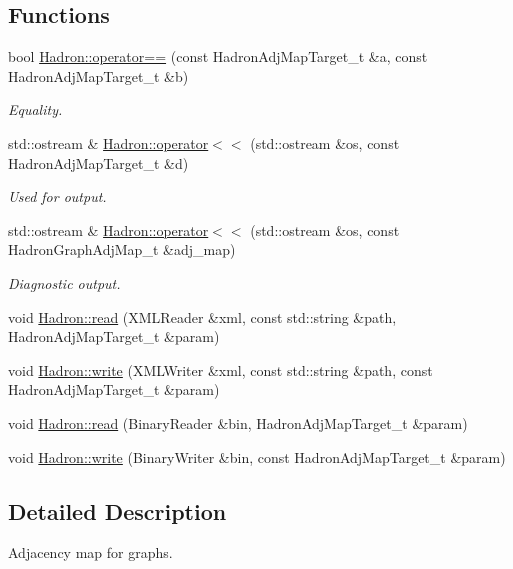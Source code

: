 \subsection*{Functions}
\begin{DoxyCompactItemize}
\item 
bool \mbox{\hyperlink{namespaceHadron_a89bb389d765cff67405fdb2d27b9b289}{Hadron\+::operator==}} (const Hadron\+Adj\+Map\+Target\+\_\+t \&a, const Hadron\+Adj\+Map\+Target\+\_\+t \&b)
\begin{DoxyCompactList}\small\item\em Equality. \end{DoxyCompactList}\item 
std\+::ostream \& \mbox{\hyperlink{namespaceHadron_ad9b3f6b8246d630d96e54032def25900}{Hadron\+::operator$<$$<$}} (std\+::ostream \&os, const Hadron\+Adj\+Map\+Target\+\_\+t \&d)
\begin{DoxyCompactList}\small\item\em Used for output. \end{DoxyCompactList}\item 
std\+::ostream \& \mbox{\hyperlink{namespaceHadron_aefc74b3ac5cc28e73ed7a9e24b032449}{Hadron\+::operator$<$$<$}} (std\+::ostream \&os, const Hadron\+Graph\+Adj\+Map\+\_\+t \&adj\+\_\+map)
\begin{DoxyCompactList}\small\item\em Diagnostic output. \end{DoxyCompactList}\item 
void \mbox{\hyperlink{namespaceHadron_a9a69bb90cd1c62da66808573864f7cd1}{Hadron\+::read}} (X\+M\+L\+Reader \&xml, const std\+::string \&path, Hadron\+Adj\+Map\+Target\+\_\+t \&param)
\item 
void \mbox{\hyperlink{namespaceHadron_add6d43a3a15c934d9c3e98989588d22e}{Hadron\+::write}} (X\+M\+L\+Writer \&xml, const std\+::string \&path, const Hadron\+Adj\+Map\+Target\+\_\+t \&param)
\item 
void \mbox{\hyperlink{namespaceHadron_a2e69cce268ca3e4d68bc0954eb3f8065}{Hadron\+::read}} (Binary\+Reader \&bin, Hadron\+Adj\+Map\+Target\+\_\+t \&param)
\item 
void \mbox{\hyperlink{namespaceHadron_a97d7de65e3fea244c875c2cb76decfda}{Hadron\+::write}} (Binary\+Writer \&bin, const Hadron\+Adj\+Map\+Target\+\_\+t \&param)
\end{DoxyCompactItemize}


\subsection{Detailed Description}
Adjacency map for graphs. 

